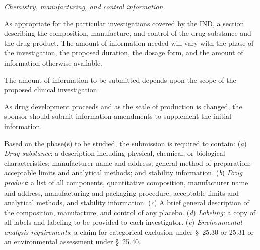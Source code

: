 \documentclass[11pt]{article}
\begin{document}
\begin{description}[leftmargin=0.5cm,style=sameline]
\item[(7)] \textit{Chemistry, manufacturing, and control information.}
\begin{description}[leftmargin=0.8cm,style=sameline]
\item[(i)] As appropriate for the particular investigations covered by the IND, a section describing the composition, manufacture, and control of the drug substance and the drug product. The amount of information needed will vary with the phase of the investigation, the proposed duration, the dosage form, and the amount of information otherwise available.
\item[(ii)] The amount of information to be submitted depends upon the scope of the proposed clinical investigation.
\item[(iii)] As drug development proceeds and as the scale of production is changed, the sponsor should submit information amendments to supplement the initial information.
\item[(iv)] Based on the phase(s) to be studied, the submission is required to contain: (\textit{a}) \textit{Drug substance}: a description including physical, chemical, or biological characteristics; manufacturer name and address; general method of preparation; acceptable limits and analytical methods; and stability information. (\textit{b}) \textit{Drug product}: a list of all components, quantitative composition, manufacturer name and address, manufacturing and packaging procedure, acceptable limits and analytical methods, and stability information. (\textit{c}) A brief general description of the composition, manufacture, and control of any placebo. (\textit{d}) \textit{Labeling}: a copy of all labels and labeling to be provided to each investigator. (\textit{e}) \textit{Environmental analysis requirements}: a claim for categorical exclusion under \S~25.30 or 25.31 or an environmental assessment under \S~25.40.
\end{description}


\end{description}
\end{document}
